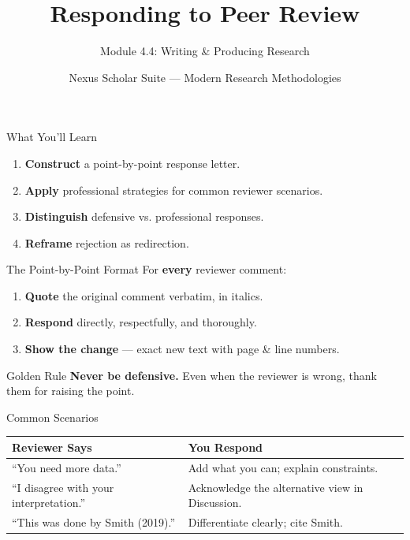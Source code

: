 \documentclass[aspectratio=169]{beamer}
\title{Responding to Peer Review}
\subtitle{Module 4.4: Writing \& Producing Research}
\author{Nexus Scholar Suite --- Modern Research Methodologies}
\date{}
\begin{document}
\begin{frame}[plain]
  \titlepage
\end{frame}

\begin{frame}{What You'll Learn}
  \begin{enumerate}
    \item \textbf{Construct} a point-by-point response letter.
    \item \textbf{Apply} professional strategies for common reviewer scenarios.
    \item \textbf{Distinguish} defensive vs. professional responses.
    \item \textbf{Reframe} rejection as redirection.
  \end{enumerate}
\end{frame}

\begin{frame}{The Point-by-Point Format}
  For \textbf{every} reviewer comment:
  \vspace{0.3cm}
  \begin{enumerate}
    \item \textbf{Quote} the original comment verbatim, in italics.
    \item \textbf{Respond} directly, respectfully, and thoroughly.
    \item \textbf{Show the change} --- exact new text with page \& line numbers.
  \end{enumerate}
  \vspace{0.3cm}
  \begin{alertblock}{Golden Rule}
    \textbf{Never be defensive.} Even when the reviewer is wrong, thank them for raising the point.
  \end{alertblock}
\end{frame}

\begin{frame}{Common Scenarios}
  \begin{table}
  \footnotesize
  \begin{tabular}{lp{6cm}}
  \toprule
  \textbf{Reviewer Says} & \textbf{You Respond} \\
  \midrule
  ``You need more data.'' & Add what you can; explain constraints. \\
  ``I disagree with your interpretation.'' & Acknowledge the alternative view in Discussion. \\
  ``This was done by Smith (2019).'' & Differentiate clearly; cite Smith. \\
  \bottomrule
  \end{tabular}
  \end{table}
\end{frame}
\end{document}
